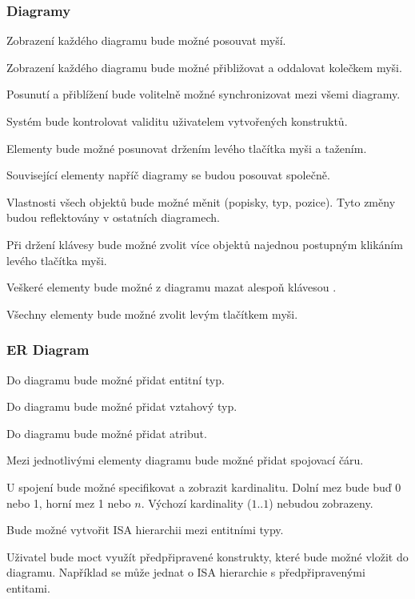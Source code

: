 \subsubsection*{Diagramy}
\begin{enumfp}[resume]
  \item Zobrazení každého diagramu bude možné posouvat myší.
  \item Zobrazení každého diagramu bude možné přibližovat a oddalovat kolečkem myši.
  \item Posunutí a přiblížení bude volitelně možné synchronizovat mezi všemi diagramy.
  \item Systém bude kontrolovat validitu uživatelem vytvořených konstruktů.
  \item Elementy bude možné posunovat držením levého tlačítka myši a tažením.
  \item Související elementy napříč diagramy se budou posouvat společně.
  \item Vlastnosti všech objektů bude možné měnit (popisky, typ, pozice).
  Tyto změny budou reflektovány v ostatních diagramech.
  \item Při držení klávesy \keys{\ctrl} bude možné zvolit více objektů najednou postupným klikáním levého tlačítka myši.
  \item Veškeré elementy bude možné z diagramu mazat alespoň klávesou .
  \item Všechny elementy bude možné zvolit levým tlačítkem myši.
\end{enumfp}

\subsubsection*{ER Diagram}
\begin{enumfp}[resume]
  \item Do diagramu bude možné přidat entitní typ.
  \item Do diagramu bude možné přidat vztahový typ.
  \item Do diagramu bude možné přidat atribut.
  \item Mezi jednotlivými elementy diagramu bude možné přidat spojovací čáru.
  \item U spojení bude možné specifikovat a zobrazit kardinalitu.
  Dolní mez bude buď 0 nebo 1, horní mez 1 nebo $n$.
  Výchozí kardinality ($1..1$) nebudou zobrazeny.
  \item Bude možné vytvořit ISA hierarchii mezi entitními typy.
  \item Uživatel bude moct využít předpřipravené konstrukty, které bude možné vložit do diagramu.
  Například se může jednat o ISA hierarchie s předpřipravenými entitami.
\end{enumfp}

